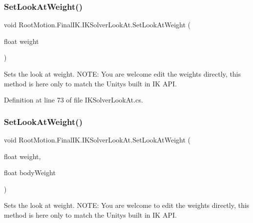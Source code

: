 \subsubsection{\texorpdfstring{Set\+Look\+At\+Weight()}{SetLookAtWeight()}\hspace{0.1cm}{\footnotesize\ttfamily [1/6]}}
{\footnotesize\ttfamily void Root\+Motion.\+Final\+I\+K.\+I\+K\+Solver\+Look\+At.\+Set\+Look\+At\+Weight (\begin{DoxyParamCaption}\item[{float}]{weight }\end{DoxyParamCaption})}



Sets the look at weight. N\+O\+TE\+: You are welcome edit the weights directly, this method is here only to match the Unity\textquotesingle{}s built in IK A\+PI. 



Definition at line 73 of file I\+K\+Solver\+Look\+At.\+cs.

\mbox{\label{class_root_motion_1_1_final_i_k_1_1_i_k_solver_look_at_ad1244f571632dab73bcd1a8035a4cd9e}} 
\subsubsection{\texorpdfstring{Set\+Look\+At\+Weight()}{SetLookAtWeight()}\hspace{0.1cm}{\footnotesize\ttfamily [2/6]}}
{\footnotesize\ttfamily void Root\+Motion.\+Final\+I\+K.\+I\+K\+Solver\+Look\+At.\+Set\+Look\+At\+Weight (\begin{DoxyParamCaption}\item[{float}]{weight,  }\item[{float}]{body\+Weight }\end{DoxyParamCaption})}



Sets the look at weight. N\+O\+TE\+: You are welcome to edit the weights directly, this method is here only to match the Unity\textquotesingle{}s built in IK A\+PI. 




